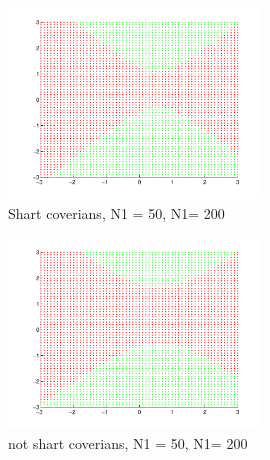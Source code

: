 \begin{figure}[!htbp]
  \centering
  \includegraphics[width=0.6\textwidth]{./images/q24a.pdf}
  \caption{Shart coverians, N1 = 50, N1= 200}
  \label{fig:q24a}
\end{figure}

\begin{figure}[!htbp]
  \centering
  \includegraphics[width=0.6\textwidth]{./images/q24b.pdf}
  \caption{not shart coverians, N1 = 50, N1= 200}
  \label{fig:q24b}
\end{figure}
